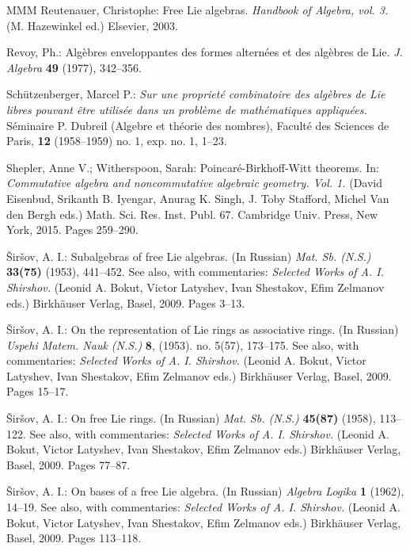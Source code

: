 \documentclass[11pt,a4paper]{amsart}
\newcommand{\gbibitem}[1]{ \bibitem{#1}}
\newcommand{\gbibitem}[1]{ \bibitem{#1}\rlap{\smash{${}^{^{[#1]}}$}}}
\newcommand{\gbibitem}[1]{ \bibitem{#1}}
\theoremstyle{definition}
\theoremstyle{plain}
\begin{document}
\begin{thebibliography}{MMM}
\gbibitem{RR}
Reutenauer, Christophe:  Free Lie algebras.
\textit{Handbook of Algebra, vol. 3.} (M. Hazewinkel ed.) Elsevier, 2003.


\gbibitem{Re}Revoy, Ph.:
Alg\`ebres enveloppantes des formes altern\'ees et des alg\`ebres de Lie.
\textit{J. Algebra}  \textbf{49}  (1977),  342--356.





\gbibitem{Sc}
Sch\"utzenberger, Marcel P.:
\textit{ Sur une propriet\'e combinatoire des alg\`ebres de Lie libres pouvant \^etre utilis\'ee dans
un probl\`eme de math\'ematiques appliqu\'ees.}
S\'eminaire P. Dubreil (Algebre et th\'eorie des nombres), Facult\'e des Sciences de Paris,
\textbf{12} (1958--1959) no. 1,  exp. no. 1,  1--23.


\gbibitem{SW}
 Shepler, Anne V.; Witherspoon, Sarah: Poincaré-Birkhoff-Witt theorems. In:
\textit{Commutative algebra and noncommutative algebraic geometry. Vol. 1.}
(David Eisenbud,
Srikanth B. Iyengar,
Anurag K. Singh,
J. Toby Stafford,
Michel Van den Bergh eds.)
Math. Sci. Res. Inst.
Publ. 67. Cambridge  Univ.  Press, New York, 2015.
Pages 259--290.


\gbibitem{S0}
\v{S}ir\v{s}ov, A. I.:
Subalgebras of free Lie algebras. (In Russian)
\textit{Mat. Sb. (N.S.)}  \textbf{33(75)}  (1953), 441--452.
See also, with commentaries:
\textit{Selected Works of A. I. Shirshov.}
(Leonid A. Bokut,
Victor Latyshev,
Ivan Shestakov,
Efim Zelmanov eds.)
Birkh\"auser Verlag, Basel, 2009.
Pages 3--13.


\gbibitem{S1}
\v{S}ir\v{s}ov, A. I.:
On the representation of Lie rings as associative rings. (In Russian)
\textit{Uspehi Matem. Nauk (N.S.)}  \textbf{8},  (1953). no. 5(57), 173--175.
See also, with commentaries:
\textit{Selected Works of A. I. Shirshov.}
(Leonid A. Bokut,
Victor Latyshev,
Ivan Shestakov,
Efim Zelmanov eds.)
Birkh\"auser Verlag, Basel, 2009. Pages 15--17.


\gbibitem{S2}
\v{S}ir\v{s}ov, A. I.:
On free Lie rings. (In Russian)
\textit{Mat. Sb. (N.S.)}  \textbf{45(87)}  (1958), 113--122.
See also, with commentaries:
\textit{Selected Works of A. I. Shirshov.}
(Leonid A. Bokut,
Victor Latyshev,
Ivan Shestakov,
Efim Zelmanov eds.)
Birkh\"auser Verlag, Basel, 2009.
Pages 77--87.


\gbibitem{S3}
\v{S}ir\v{s}ov, A. I.:
On bases of a free Lie algebra. (In Russian) \textit{Algebra Logika} \textbf{1} (1962),
14--19.
See also, with commentaries:
\textit{Selected Works of A. I. Shirshov.}
(Leonid A. Bokut,
Victor Latyshev,
Ivan Shestakov,
Efim Zelmanov eds.)
Birkh\"auser Verlag, Basel, 2009.
Pages 113--118.


\end{thebibliography}
\end{document}
